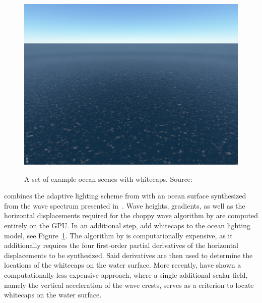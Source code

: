 \begin{figure}
{  \includegraphics[scale=0.125]{figures/Real-time_Animation_and_Rendering_of_Ocean_Whitecaps-004.png}
 }
\caption[Ocean whitecaps by \cite{article:whitecaps}.]{
A set of example ocean scenes with whitecaps. Source:~\cite{article:whitecaps}
}
\label{fig:dupuy:whitecaps}
\end{figure}
%
%
\citet{misc:oceanlightingfft} combines the adaptive lighting scheme
from \citet{article:oceanlighting} with an ocean surface synthesized
from the wave spectrum presented in~\citet{article:Elfouhaily1997}.
Wave heights, gradients, as well as the horizontal displacements
required for the choppy wave algorithm by \citet{course:simulatingocean}
are computed entirely on the GPU. 
\textcolor{changed}{In an additional step,
\citet{article:whitecaps} add whitecaps to the ocean lighting model,
see Figure~\ref{fig:dupuy:whitecaps}.
The algorithm by \citeauthor{article:whitecaps} is computationally
expensive, as it additionally requires the four first-order partial
derivatives of the horizontal displacements to be synthesized. Said
derivatives are then used to determine the locations of the whitecaps
on the water surface.
More recently, \citet{Chen:2017} have shown a computationally less
expensive approach, where a single additional scalar field, namely
the vertical acceleration of the wave crests, serves as a criterion
to locate whitecaps on the water surface.
}

